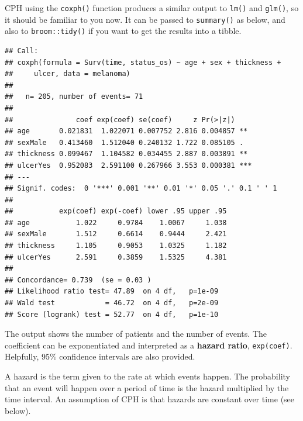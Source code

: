 \documentclass[
  12pt,
  krantz2]{krantz}
\makeatletter
\newenvironment{Shaded}{\begin{snugshade}}{\end{snugshade}}
\newcommand{\DataTypeTok}[1]{\textcolor[rgb]{0.13,0.29,0.53}{#1}}
\newcommand{\KeywordTok}[1]{\textcolor[rgb]{0.13,0.29,0.53}{\textbf{#1}}}
\newcommand{\NormalTok}[1]{#1}
\newcommand{\OperatorTok}[1]{\textcolor[rgb]{0.81,0.36,0.00}{\textbf{#1}}}
\newcommand{\StringTok}[1]{\textcolor[rgb]{0.31,0.60,0.02}{#1}}
\newenvironment{kframe}{%
\medskip{}
\setlength{\fboxsep}{.8em}
 \def\at@end@of@kframe{}%
 \ifinner\ifhmode%
  \def\at@end@of@kframe{\end{minipage}}%
  \begin{minipage}{\columnwidth}%
 \fi\fi%
 \def\FrameCommand##1{\hskip\@totalleftmargin \hskip-\fboxsep
 \colorbox{shadecolor}{##1}\hskip-\fboxsep
     \hskip-\linewidth \hskip-\@totalleftmargin \hskip\columnwidth}%
 \MakeFramed {\advance\hsize-\width
   \@totalleftmargin\z@ \linewidth\hsize
   \@setminipage}}%
 {\par\unskip\endMakeFramed%
 \at@end@of@kframe}
\renewenvironment{Shaded}{\begin{kframe}}{\end{kframe}}
\makeatother
\begin{document}
CPH using the \texttt{coxph()} function produces a similar output to \texttt{lm()} and \texttt{glm()}, so it should be familiar to you now.
It can be passed to \texttt{summary()} as below, and also to \texttt{broom::tidy()} if you want to get the results into a tibble.

\begin{Shaded}
\end{Shaded}

\begin{verbatim}
## Call:
## coxph(formula = Surv(time, status_os) ~ age + sex + thickness + 
##     ulcer, data = melanoma)
## 
##   n= 205, number of events= 71 
## 
##               coef exp(coef) se(coef)     z Pr(>|z|)    
## age       0.021831  1.022071 0.007752 2.816 0.004857 ** 
## sexMale   0.413460  1.512040 0.240132 1.722 0.085105 .  
## thickness 0.099467  1.104582 0.034455 2.887 0.003891 ** 
## ulcerYes  0.952083  2.591100 0.267966 3.553 0.000381 ***
## ---
## Signif. codes:  0 '***' 0.001 '**' 0.01 '*' 0.05 '.' 0.1 ' ' 1
## 
##           exp(coef) exp(-coef) lower .95 upper .95
## age           1.022     0.9784    1.0067     1.038
## sexMale       1.512     0.6614    0.9444     2.421
## thickness     1.105     0.9053    1.0325     1.182
## ulcerYes      2.591     0.3859    1.5325     4.381
## 
## Concordance= 0.739  (se = 0.03 )
## Likelihood ratio test= 47.89  on 4 df,   p=1e-09
## Wald test            = 46.72  on 4 df,   p=2e-09
## Score (logrank) test = 52.77  on 4 df,   p=1e-10
\end{verbatim}

The output shows the number of patients and the number of events.
The coefficient can be exponentiated and interpreted as a \textbf{hazard ratio}, \texttt{exp(coef)}.
Helpfully, 95\% confidence intervals are also provided.

A hazard is the term given to the rate at which events happen.
The probability that an event will happen over a period of time is the hazard multiplied by the time interval.
An assumption of CPH is that hazards are constant over time (see below).
\end{document}
